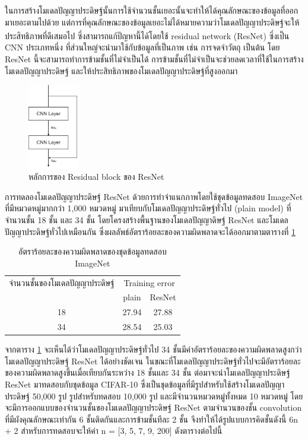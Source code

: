 ในการสร้างโมเดลปัญญาประดิษฐ์นั้นการใช้จำนวนชั้นเยอะนั้นจะทำให้ได้คุณลักษณะของข้อมูลที่ออกมาเยอะตามไปด้วย 
แต่การที่คุณลักษณะของข้อมูลเยอะไม่ได้หมายความว่าโมเดลปัญญาประดิษฐ์จะให้ประสิทธิภาพที่ดีเสมอไป ซึ่งสามารถแก้ปัญหานี้ได้โดยใช้ residual network (ResNet)\textsuperscript{\cite{he2016deep}} 
ซึ่งเป็น CNN ประเภทหนึ่ง ที่ส่วนใหญ่จะนำมาใช้กับข้อมูลที่เป็นภาพ เช่น การจดจำวัตถุ เป็นต้น โดย ResNet นี้จะสามารถทำการข้ามชั้นที่ไม่จำเป็นได้ 
การข้ามชั้นที่ไม่จำเป็นจะช่วยลดเวลาที่ใช้ในการสร้างโมเดลปัญญาประดิษฐ์ และให้ประสิทธิภาพของโมเดลปัญญาประดิษฐ์ที่สูงออกมา

\begin{figure}[!ht]
	\centering
	\includegraphics[width=0.2\textwidth]{chapter2/images/example_resnet.png}
		\caption{หลักการของ Residual block ของ ResNet}
    	\label{fig:ResNet}
\end{figure}

การทดลองโมเดลปัญญาประดิษฐ์ ResNet ด้วยการทำจำแนกภาพโดยใช้ชุดข้อมูลทดสอบ ImageNet ที่มีหมวดหมู่มากกว่า 1,000 หมวดหมู่
มาเทียบกับโมเดลปัญญาประดิษฐ์ทั่วไป (plain model) ที่จำนวนชั้น 18 ชั้น และ 34 ชั้น โดยโครงสร้างพื้นฐานของโมเดลปัญญาดิษฐ์ ResNet และโมเดลปัญญาประดิษฐ์ทั่วไปเหมือนกัน 
ซึ่งผลลัพธ์อัตราร้อยละของความผิดพลาดจะได้ออกมาตามตารางที่ \ref{tab: Top-1 error of ImageNet} 

\begin{table}[!ht]
	\centering
	\begin{tabular}{|c|c|c|}
		\hline
		{จำนวนชั้นของโมเดลปัญญาประดิษฐ์}&\multicolumn{2}{c|}{Training error}\\
		\cline{2-3}
		{}							& plain						& ResNet			\\
		\hline
		18							& 27.94						& 27.88				\\
		34							& 28.54						& 25.03				\\
		\hline
	\end{tabular}
	\caption{อัตราร้อยละของความผิดพลาดของชุดข้อมูลทดสอบ ImageNet}
	\label{tab: Top-1 error of ImageNet}
\end{table}

จากตาราง \ref{tab: Top-1 error of ImageNet} จะเห็นได้ว่าโมเดลปัญญาประดิษฐ์ทั่วไป 34 ชั้นมีค่าอัตราร้อยละของความผิดพลาดสูงกว่าโมเดลปัญญาประดิษฐ์ ResNet 
ได้อย่างชัดเจน ในขณะที่โมเดลปัญญาประดิษฐ์ทั่วไปจะมีอัตราร้อยละของความผิดพลาดสูงขึ้นเมื่อเทียบกันระหว่าง 18 ชั้นและ 34 ชั้น
\clearpage
ต่อมาจะนำโมเดลปัญญาประดิษฐ์ ResNet มาทดสอบกับชุดข้อมูล CIFAR-10 ซึ่งเป็นชุดข้อมูลที่มีรูปสำหรับใช้สร้างโมเดลปัญญาประดิษฐ์ 50,000 รูป รูปสำหรับทดสอบ 10,000 รูป 
และมีจำนวนหมวดหมู่ทั้งหมด 10 หมวดหมู่ โดยจะมีการออกแบบของจำนวนชั้นของโมเดลปัญญาประดิษฐ์ ResNet ตามจำนวนของชั้น convolution 
ที่มีผังคุณลักษณะเท่ากัน 6 ชั้นติดกันและการข้ามชั้นทีละ 2 ชั้น จึงทำให้ได้รูปแบบการคิดชั้นดังนี้ 6n + 2 สำหรับการทดสอบจะให้ค่า n = [3, 5, 7, 9, 200] ดังตารางต่อไปนี้

